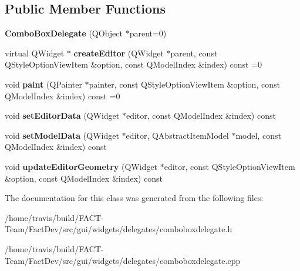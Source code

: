 \subsection*{Public Member Functions}
\begin{DoxyCompactItemize}
\item 
\hypertarget{classGui_1_1Widgets_1_1Delegates_1_1ComboBoxDelegate_a34105ef48d776c556598b9b15e7abdcc}{{\bfseries Combo\-Box\-Delegate} (Q\-Object $\ast$parent=0)}\label{classGui_1_1Widgets_1_1Delegates_1_1ComboBoxDelegate_a34105ef48d776c556598b9b15e7abdcc}

\item 
\hypertarget{classGui_1_1Widgets_1_1Delegates_1_1ComboBoxDelegate_aa24c5896e30295ad7dbe47c91093b2db}{virtual Q\-Widget $\ast$ {\bfseries create\-Editor} (Q\-Widget $\ast$parent, const Q\-Style\-Option\-View\-Item \&option, const Q\-Model\-Index \&index) const =0}\label{classGui_1_1Widgets_1_1Delegates_1_1ComboBoxDelegate_aa24c5896e30295ad7dbe47c91093b2db}

\item 
\hypertarget{classGui_1_1Widgets_1_1Delegates_1_1ComboBoxDelegate_a0b7f0752890cd3fb257361a7990a74c2}{void {\bfseries paint} (Q\-Painter $\ast$painter, const Q\-Style\-Option\-View\-Item \&option, const Q\-Model\-Index \&index) const =0}\label{classGui_1_1Widgets_1_1Delegates_1_1ComboBoxDelegate_a0b7f0752890cd3fb257361a7990a74c2}

\item 
\hypertarget{classGui_1_1Widgets_1_1Delegates_1_1ComboBoxDelegate_a30d218e265b7656e17fece8a73e53e90}{void {\bfseries set\-Editor\-Data} (Q\-Widget $\ast$editor, const Q\-Model\-Index \&index) const }\label{classGui_1_1Widgets_1_1Delegates_1_1ComboBoxDelegate_a30d218e265b7656e17fece8a73e53e90}

\item 
\hypertarget{classGui_1_1Widgets_1_1Delegates_1_1ComboBoxDelegate_a2f2d51e4e44e7f3cdc9baac783bbc1b1}{void {\bfseries set\-Model\-Data} (Q\-Widget $\ast$editor, Q\-Abstract\-Item\-Model $\ast$model, const Q\-Model\-Index \&index) const }\label{classGui_1_1Widgets_1_1Delegates_1_1ComboBoxDelegate_a2f2d51e4e44e7f3cdc9baac783bbc1b1}

\item 
\hypertarget{classGui_1_1Widgets_1_1Delegates_1_1ComboBoxDelegate_abdf54b72e544b24cc34270154ae6aed3}{void {\bfseries update\-Editor\-Geometry} (Q\-Widget $\ast$editor, const Q\-Style\-Option\-View\-Item \&option, const Q\-Model\-Index \&index) const }\label{classGui_1_1Widgets_1_1Delegates_1_1ComboBoxDelegate_abdf54b72e544b24cc34270154ae6aed3}

\end{DoxyCompactItemize}


The documentation for this class was generated from the following files\-:\begin{DoxyCompactItemize}
\item 
/home/travis/build/\-F\-A\-C\-T-\/\-Team/\-Fact\-Dev/src/gui/widgets/delegates/comboboxdelegate.\-h\item 
/home/travis/build/\-F\-A\-C\-T-\/\-Team/\-Fact\-Dev/src/gui/widgets/delegates/comboboxdelegate.\-cpp\end{DoxyCompactItemize}
